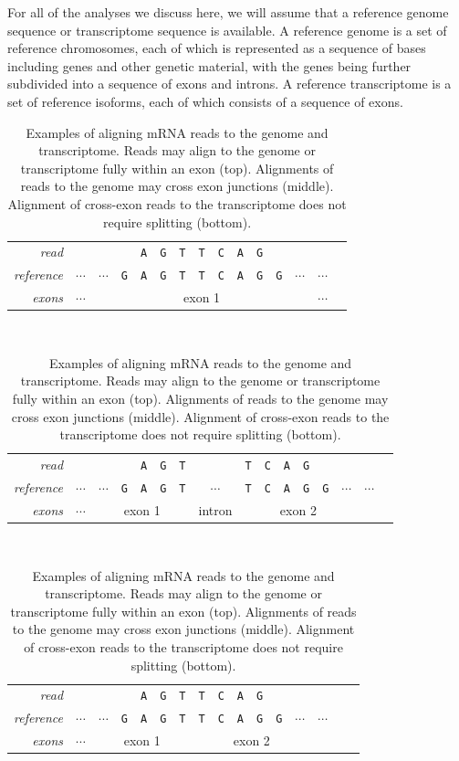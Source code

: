 \documentclass[11pt]{report}
\newcommand{\mybase}[1]{\texttt{#1}\xspace}
\newcommand{\baseA}{\mybase{A}}
\newcommand{\baseC}{\mybase{C}}
\newcommand{\baseG}{\mybase{G}}
\newcommand{\baseT}{\mybase{T}}
\newcommand{\mycaption}[2]{\caption{#2}\label{#1}}
\begin{document}
For all of the analyses we discuss here, we will assume that a
reference genome sequence or transcriptome sequence is available. A
reference genome is a set of reference chromosomes, each of which is
represented as a sequence of bases including genes and other genetic
material, with the genes being further subdivided into a sequence of
exons and introns. A reference transcriptome is a set of reference
isoforms, each of which consists of a sequence of exons.

\begin{table}[t!]
  \centering\small
  \begin{tabular}{r|cccccccccccccc}
    \textit{read} &  & & & \baseA & \baseG & \baseT & \baseT & \baseC & \baseA & \baseG &
    \\
    \textit{reference} & $\cdots$ & $\cdots$ & \baseG & \baseA & \baseG & \baseT & \baseT & \baseC & \baseA & \baseG & \baseG & $\cdots$ & $\cdots$
    \\ \hline
    \textit{exons} & $\cdots$ & \multicolumn{11}{|c|}{exon 1} & $\cdots$
  \end{tabular}
  \\[12pt]
  \begin{tabular}{r|ccccccccccccccc}
    \textit{read} &  & & & \baseA & \baseG & \baseT & & \baseT & \baseC & \baseA & \baseG &
    \\
    \textit{reference} & $\cdots$ & $\cdots$ & \baseG & \baseA & \baseG & \baseT & $\cdots$ & \baseT & \baseC & \baseA & \baseG & \baseG & $\cdots$ & $\cdots$
    \\ \hline
    \textit{exons} & $\cdots$ & \multicolumn{5}{|c|}{exon 1} & intron
                         & \multicolumn{6}{|c|}{exon 2}
  \end{tabular}
  \\[12pt]
  \begin{tabular}{r|ccccccccccccccc}
    \textit{read} &  & & & \baseA & \baseG & \baseT & \baseT & \baseC & \baseA & \baseG &
    \\
    \textit{reference} & $\cdots$ & $\cdots$ & \baseG & \baseA & \baseG & \baseT & \baseT & \baseC & \baseA & \baseG & \baseG  & $\cdots$ & $\cdots$
    \\ \hline
    \textit{exons} & $\cdots$ & \multicolumn{5}{|c|}{exon 1}
                       & \multicolumn{6}{|c|}{exon 2}
  \end{tabular}
  \mycaption{tab:split-align}{Examples of aligning mRNA reads to the
    genome and transcriptome. Reads may align to the genome or
    transcriptome fully within an exon (top). Alignments of reads to
    the genome may cross exon junctions (middle). Alignment of
    cross-exon reads to the transcriptome does not require splitting
    (bottom).}
  \label{tab:my_label}
\end{table}
\end{document}

